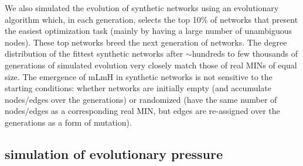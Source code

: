 \documentclass[12pt]{article}
\begin{document}
We also simulated the evolution of synthetic networks using an evolutionary algorithm which, in each generation, selects the top 10\% of networks that present the easiest optimization task (mainly by having a large number of unambiguous nodes). These top networks  breed the next generation of networks. The degree distribution of the fittest synthetic networks after  ${\sim}$hundreds to few thousands of generations  of simulated evolution very closely match those of real MINs of equal size.  The emergence of mLmH in synthetic networks is not sensitive to the starting conditions: whether networks are initially empty (and accumulate nodes/edges over the generations) or randomized (have the same number of nodes/edges as a corresponding real MIN, but edges are re-assigned over the generations as a form of mutation).

\subsection{simulation of evolutionary pressure}
\end{document}
